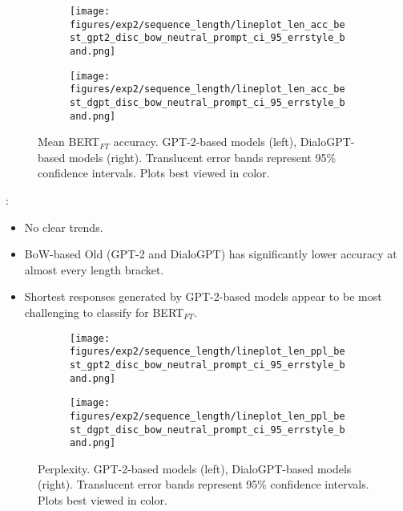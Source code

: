 \begin{figure}[H]
     \centering
     \begin{subfigure}[b]{0.49\textwidth}
        \centering
\texttt{[image: figures/exp2/sequence\_length/lineplot\_len\_acc\_best\_gpt2\_disc\_bow\_neutral\_prompt\_ci\_95\_errstyle\_band.png]}
        \caption{}
        \label{subfig:lineplot_length_acc_np_gpt2}
     \end{subfigure}
     \hfill
     \begin{subfigure}[b]{0.49\textwidth}
        \centering
        \texttt{[image: figures/exp2/sequence\_length/lineplot\_len\_acc\_best\_dgpt\_disc\_bow\_neutral\_prompt\_ci\_95\_errstyle\_band.png]}
        \caption{}
        \label{subfig:lineplot_length_acc_np_dgpt}
     \end{subfigure}
        \caption{Mean BERT$_{FT}$ accuracy. GPT-2-based models (left), DialoGPT-based models (right). Translucent error bands represent 95\% confidence intervals. Plots best viewed in color.}
        \label{fig:lineplots_length_acc_np_gpt2_dgpt}
\end{figure}

:
\begin{itemize}
    \item No clear trends.
    \item BoW-based Old (GPT-2 and DialoGPT) has significantly lower accuracy at almost every length bracket.
    \item Shortest responses generated by GPT-2-based models appear to be most challenging to classify for BERT$_{FT}$.
\end{itemize}

\begin{figure}[H]
     \centering
     \begin{subfigure}[b]{0.49\textwidth}
        \centering
\texttt{[image: figures/exp2/sequence\_length/lineplot\_len\_ppl\_best\_gpt2\_disc\_bow\_neutral\_prompt\_ci\_95\_errstyle\_band.png]}
        \caption{}
        \label{subfig:lineplot_length_ppl_np_gpt2}
     \end{subfigure}
     \hfill
     \begin{subfigure}[b]{0.49\textwidth}
        \centering
        \texttt{[image: figures/exp2/sequence\_length/lineplot\_len\_ppl\_best\_dgpt\_disc\_bow\_neutral\_prompt\_ci\_95\_errstyle\_band.png]}
        \caption{}
        \label{subfig:lineplot_length_ppl_np_dgpt}
     \end{subfigure}
        \caption{Perplexity. GPT-2-based models (left), DialoGPT-based models (right). Translucent error bands represent 95\% confidence intervals. Plots best viewed in color.}
        \label{fig:lineplots_length_ppl_np_gpt2_dgpt}
\end{figure}

